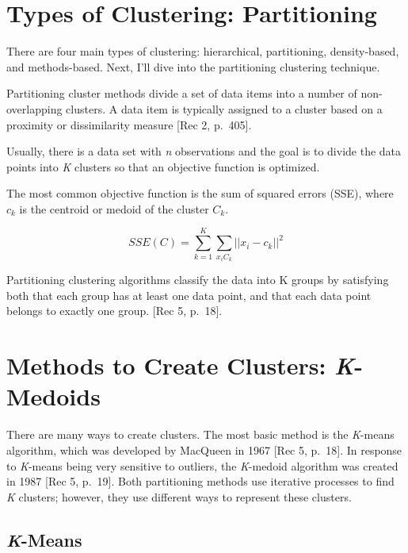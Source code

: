 \documentclass[12pt,twoside]{amherstthesis}
\begin{document}
  \section{Types of Clustering:
  Partitioning}\label{types-of-clustering-partitioning}
  
  There are four main types of clustering: hierarchical, partitioning,
  density-based, and methods-based. Next, I'll dive into the partitioning
  clustering technique.
  
  Partitioning cluster methods divide a set of data items into a number of
  non-overlapping clusters. A data item is typically assigned to a cluster
  based on a proximity or dissimilarity measure {[}Rec 2, p.~405{]}.
  
  Usually, there is a data set with \emph{n} observations and the goal is
  to divide the data points into \emph{K} clusters so that an objective
  function is optimized.
  
  The most common objective function is the sum of squared errors (SSE),
  where \(c_k\) is the centroid or medoid of the cluster \(C_k\).
  
  \[SSE(C)= \sum_{k=1}^K \sum_{x_{i}C_{k}} ||{x_i}- c_k||^2\]
  
  Partitioning clustering algorithms classify the data into K groups by
  satisfying both that each group has at least one data point, and that
  each data point belongs to exactly one group. {[}Rec 5, p.~18{]}.
  
  \section{\texorpdfstring{Methods to Create Clusters:
  \emph{K}-Medoids}{Methods to Create Clusters: K-Medoids}}\label{methods-to-create-clusters-k-medoids}
  
  There are many ways to create clusters. The most basic method is the
  \emph{K}-means algorithm, which was developed by MacQueen in 1967 {[}Rec
  5, p.~18{]}. In response to \emph{K}-means being very sensitive to
  outliers, the \emph{K}-medoid algorithm was created in 1987 {[}Rec 5,
  p.~19{]}. Both partitioning methods use iterative processes to find
  \emph{K} clusters; however, they use different ways to represent these
  clusters.
  
  \subsection{\texorpdfstring{\emph{K}-Means}{K-Means}}\label{k-means}
  
\end{document}
